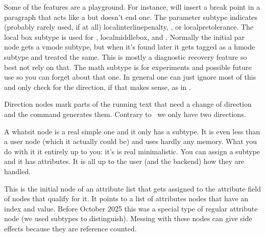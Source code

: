 Some of the features are a playground. For instance,  will
insert a break point in a paragraph that acts like a  but doesn't end
one. The parameter subtype indicates (probably rarely used, if at all) \prm
{localinterlinepenalty}, ,  or \prm
{localpretolerance}. The local box subtype is used for , \prm
{localmiddlebox},  and . Normally the
initial par node gets a vmode subtype, but when it's found later it gets tagged
as a hmode subtype and treated the same. This is mostly a diagnostic recovery
feature so best not rely on that. The math subtype is for experiments and
possible future use so you can forget about that one. In general one can just
ignore most of this and only check for the direction, if that makes sense, as in
\LUATEX.


\stopsubsection

\startsubsection[title={dir}]

Direction nodes mark parts of the running text that need a change of direction
and the \type {\textdirection} command generates them. Contrary to \LUATEX\
we only have two directions.



\stopsubsection

\startsubsection[title={whatsit}]

A whatsit node is a real simple one and it only has a subtype. It is even less
than a user node (which it actually could be) and uses hardly any memory. What
you do with it it entirely up to you: it's is real minimalistic. You can assign a
subtype and it has attributes. It is all up to the user (and the backend) how
they are handled.



\stopsubsection

\startsubsection[title={attributelist}]

This is the initial node of an attribute list that gets assigned to the attribute
field of nodes that qualify for it. It points to a list of attributes nodes that
have an index and value. Before October 2025 this was a special type of regular
attribute node (we used subtypes to distinguish). Messing with these nodes can
give side effects because they are reference counted.

